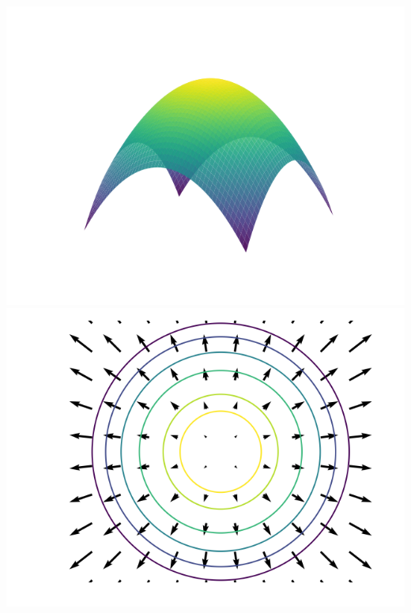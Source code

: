 \begin{center}
\begin{minipage}{0.30\textwidth}
		\ \ \includegraphics[scale=\myscale,scale=0.35]{figures/gradient-surface-2}\\
		
		\includegraphics[scale=\myscale,scale=0.35]{figures/gradient-surface-5b}
		

\end{minipage}
\end{center}
